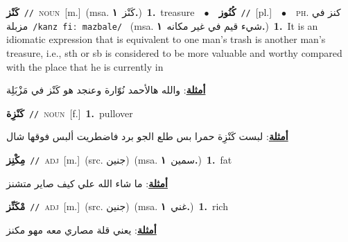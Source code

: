 \documentclass[10pt,a4paper,twoside]{article} %
\begin{document}
\begin{multicols}{2}
{\setlength\topsep{0pt}\textbf{\foreignlanguage{arabic}{كَنْز}}\ {\color{gray}\texttt{//}\color{black}}\ \textsc{noun}\ [m.]\ \color{gray}(msa. \foreignlanguage{arabic}{كَنْز}~\foreignlanguage{arabic}{\textbf{١.}})\color{black}\ \textbf{1.}~treasure\ \ $\bullet$\ \ \setlength\topsep{0pt}\textbf{\foreignlanguage{arabic}{كُنُوز}}\ {\color{gray}\texttt{//}\color{black}}\ [pl.]\ \ $\bullet$\ \ \textsc{ph.} \color{gray} \foreignlanguage{arabic}{كنز في مزبلة}\color{black}\ {\color{gray}\texttt{/{\sffamily kanz fiː mazbale}/}\color{black}}\ \color{gray} (msa. \foreignlanguage{arabic}{شيء قيم في غير مكانه}~\foreignlanguage{arabic}{\textbf{١.}})\color{black}\ \textbf{1.}~It is an idiomatic expression that is equivalent to one man's trash is another man's treasure, i.e., sth or sb is considered to be more valuable and worthy compared with the place that he is currently in\  \begin{flushright}\color{gray}\foreignlanguage{arabic}{\textbf{\underline{\foreignlanguage{arabic}{أمثلة}}}: والله هالأحمد نُوّارة وعنجد هو كَنْز في مَزْبَلِة}\end{flushright}\color{black}} \vspace{2mm}

{\setlength\topsep{0pt}\textbf{\foreignlanguage{arabic}{كَنْزِة}}\ {\color{gray}\texttt{//}\color{black}}\ \textsc{noun}\ [f.]\ \textbf{1.}~pullover\  \begin{flushright}\color{gray}\foreignlanguage{arabic}{\textbf{\underline{\foreignlanguage{arabic}{أمثلة}}}: لبست كَنْزِة حمرا بس طلع الجو برد فاضطريت ألبس فوقها شال}\end{flushright}\color{black}} \vspace{2mm}

{\setlength\topsep{0pt}\textbf{\foreignlanguage{arabic}{مِكْنِز}}\ {\color{gray}\texttt{//}\color{black}}\ \textsc{adj}\ [m.]\ (src. \color{gray}\foreignlanguage{arabic}{جنين}\color{black})\ \color{gray}(msa. \foreignlanguage{arabic}{سمين}~\foreignlanguage{arabic}{\textbf{١.}})\color{black}\ \textbf{1.}~fat\  \begin{flushright}\color{gray}\foreignlanguage{arabic}{\textbf{\underline{\foreignlanguage{arabic}{أمثلة}}}: ما شاء الله علي كيف صاير متشنز}\end{flushright}\color{black}} \vspace{2mm}

{\setlength\topsep{0pt}\textbf{\foreignlanguage{arabic}{مْكَنِّز}}\ {\color{gray}\texttt{//}\color{black}}\ \textsc{adj}\ [m.]\ (src. \color{gray}\foreignlanguage{arabic}{جنين}\color{black})\ \color{gray}(msa. \foreignlanguage{arabic}{غني}~\foreignlanguage{arabic}{\textbf{١.}})\color{black}\ \textbf{1.}~rich\  \begin{flushright}\color{gray}\foreignlanguage{arabic}{\textbf{\underline{\foreignlanguage{arabic}{أمثلة}}}: يعني قلة مصاري معه مهو مكنز}\end{flushright}\color{black}} \vspace{2mm}


\end{multicols}
\end{document}
